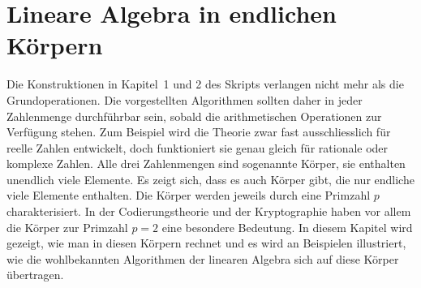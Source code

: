 %
%
%
\chapter{Lineare Algebra in endlichen Körpern
\label{chapter:endlichekoerper}}

Die Konstruktionen in Kapitel~1 und 2 des Skripts verlangen nicht mehr
als die Grundoperationen.
Die vorgestellten Algorithmen sollten daher in jeder Zahlenmenge
durchführbar sein, sobald die arithmetischen Operationen zur
Verfügung stehen.
Zum Beispiel wird die Theorie zwar fast ausschliesslich für reelle
Zahlen entwickelt, doch funktioniert sie genau gleich für rationale
oder komplexe Zahlen.
Alle drei Zahlenmengen sind sogenannte Körper, sie enthalten
unendlich viele Elemente.
Es zeigt sich, dass es auch Körper gibt, die nur endliche viele
Elemente enthalten.
Die Körper werden jeweils durch eine Primzahl $p$ charakterisiert.
In der Codierungstheorie und der Kryptographie haben vor allem die
Körper zur Primzahl $p=2$ eine besondere Bedeutung.
In diesem Kapitel wird gezeigt, wie man in diesen Körpern rechnet
und es wird an Beispielen illustriert, wie die wohlbekannten Algorithmen
der linearen Algebra sich auf diese Körper übertragen.






